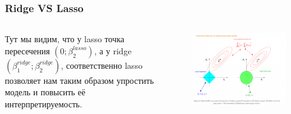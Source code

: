 \documentclass[ucs, notheorems, handout]{beamer}
\begin{document}
	\begin{frame}
		\frametitle{Ridge VS Lasso}	
		\begin{columns}
			\begin{column}{0.47\textwidth}
				
			Тут мы видим, что у lasso точка пересечения $(0; \beta_{2}^{lasso})$, а у ridge  $(\beta_{1}^{ridge}; \beta_{2}^{ridge})$, соответственно lasso позволяет нам таким образом упростить модель и повысить её интерпретируемость.
				
				
				
			\end{column}
			\begin{column}{0.5\textwidth}
				\begin{figure}[]
					\includegraphics[width=1.1\textwidth]{../img/1}
				\end{figure}
			\end{column}
		\end{columns}
		\note{
			
		}
	\end{frame}
	
\end{document}
